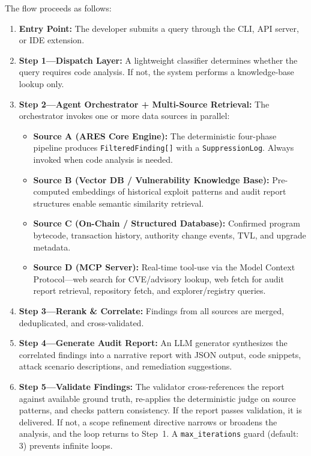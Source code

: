 \documentclass{article}
\begin{document}
The flow proceeds as follows:

\begin{enumerate}
  \item \textbf{Entry Point:} The developer submits a query through the CLI, API server, or IDE extension.
  \item \textbf{Step 1---Dispatch Layer:} A lightweight classifier determines whether the query requires code analysis. If not, the system performs a knowledge-base lookup only.
  \item \textbf{Step 2---Agent Orchestrator + Multi-Source Retrieval:} The orchestrator invokes one or more data sources in parallel:
  \begin{itemize}
    \item \textbf{Source A (ARES Core Engine):} The deterministic four-phase pipeline produces \texttt{FilteredFinding[]} with a \texttt{SuppressionLog}. Always invoked when code analysis is needed.
    \item \textbf{Source B (Vector DB / Vulnerability Knowledge Base):} Pre-computed embeddings of historical exploit patterns and audit report structures enable semantic similarity retrieval.
    \item \textbf{Source C (On-Chain / Structured Database):} Confirmed program bytecode, transaction history, authority change events, TVL, and upgrade metadata.
    \item \textbf{Source D (MCP Server):} Real-time tool-use via the Model Context Protocol---web search for CVE/advisory lookup, web fetch for audit report retrieval, repository fetch, and explorer/registry queries.
  \end{itemize}
  \item \textbf{Step 3---Rerank \& Correlate:} Findings from all sources are merged, deduplicated, and cross-validated.
  \item \textbf{Step 4---Generate Audit Report:} An LLM generator synthesizes the correlated findings into a narrative report with JSON output, code snippets, attack scenario descriptions, and remediation suggestions.
  \item \textbf{Step 5---Validate Findings:} The validator cross-references the report against available ground truth, re-applies the deterministic judge on source patterns, and checks pattern consistency. If the report passes validation, it is delivered. If not, a scope refinement directive narrows or broadens the analysis, and the loop returns to Step~1. A \texttt{max\_iterations} guard (default: 3) prevents infinite loops.
\end{enumerate}
\end{document}
